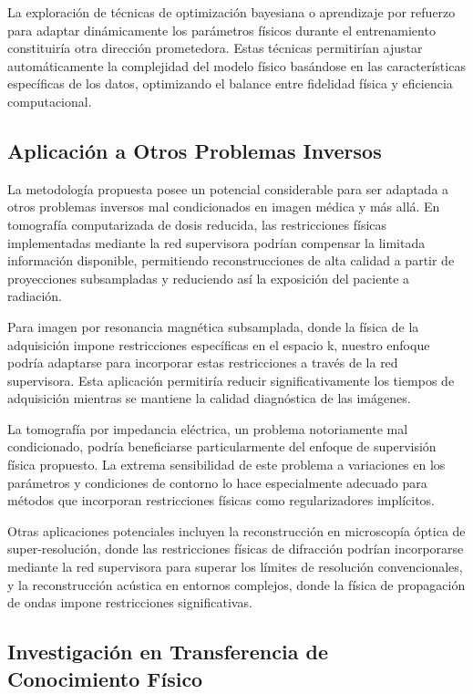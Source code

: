 La exploración de técnicas de optimización bayesiana o aprendizaje por refuerzo para adaptar dinámicamente los parámetros físicos durante el entrenamiento constituiría otra dirección prometedora. Estas técnicas permitirían ajustar automáticamente la complejidad del modelo físico basándose en las características específicas de los datos, optimizando el balance entre fidelidad física y eficiencia computacional.

\subsection{Aplicación a Otros Problemas Inversos}

La metodología propuesta posee un potencial considerable para ser adaptada a otros problemas inversos mal condicionados en imagen médica y más allá. En tomografía computarizada de dosis reducida, las restricciones físicas implementadas mediante la red supervisora podrían compensar la limitada información disponible, permitiendo reconstrucciones de alta calidad a partir de proyecciones subsampladas y reduciendo así la exposición del paciente a radiación.

Para imagen por resonancia magnética subsamplada, donde la física de la adquisición impone restricciones específicas en el espacio k, nuestro enfoque podría adaptarse para incorporar estas restricciones a través de la red supervisora. Esta aplicación permitiría reducir significativamente los tiempos de adquisición mientras se mantiene la calidad diagnóstica de las imágenes.

La tomografía por impedancia eléctrica, un problema notoriamente mal condicionado, podría beneficiarse particularmente del enfoque de supervisión física propuesto. La extrema sensibilidad de este problema a variaciones en los parámetros y condiciones de contorno lo hace especialmente adecuado para métodos que incorporan restricciones físicas como regularizadores implícitos.

Otras aplicaciones potenciales incluyen la reconstrucción en microscopía óptica de super-resolución, donde las restricciones físicas de difracción podrían incorporarse mediante la red supervisora para superar los límites de resolución convencionales, y la reconstrucción acústica en entornos complejos, donde la física de propagación de ondas impone restricciones significativas.

\subsection{Investigación en Transferencia de Conocimiento Físico}

